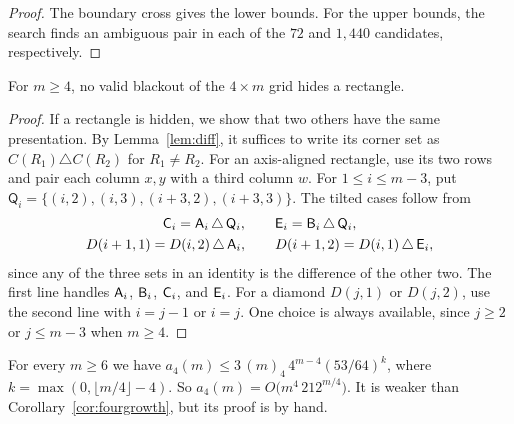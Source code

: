 \begin{proof}
The boundary cross gives the lower bounds. For the upper bounds,
the search finds an ambiguous pair in each of the $72$ and $1{,}440$
candidates, respectively.
\end{proof}

\begin{theorem}\label{thm:hidden}
For $m\ge4$, no valid blackout of the $4\times m$ grid hides a rectangle.
\end{theorem}

\begin{proof}
If a rectangle is hidden, we show that two others have the same presentation.
By Lemma~\ref{lem:diff}, it suffices to write its corner set as
$C(R_1)\triangle C(R_2)$ for $R_1\ne R_2$.
For an axis-aligned rectangle, use its two rows and pair each column
$x,y$ with a third column $w$.
For $1\le i\le m-3$, put
$\mathsf Q_i=\{(i,2),(i,3),(i+3,2),(i+3,3)\}$. The tilted cases follow from
\begin{equation}\label{eq:fourxor}
\begin{gathered}
\mathsf{C}_i=\mathsf{A}_i\,\triangle\,\mathsf Q_i,\qquad \mathsf{E}_i=\mathsf{B}_i\,\triangle\,\mathsf Q_i,\\
D(i+1,1)=D(i,2)\,\triangle\,\mathsf{A}_i,\qquad D(i+1,2)=D(i,1)\,\triangle\,\mathsf{E}_i,
\end{gathered}
\end{equation}
since any of the three sets in an identity is the difference of the
other two. The first line handles $\mathsf{A}_i$, $\mathsf{B}_i$, $\mathsf{C}_i$, and $\mathsf{E}_i$.
For a diamond $D(j,1)$ or $D(j,2)$, use the second line with $i=j-1$
or $i=j$. One choice is always available, since $j\ge2$ or
$j\le m-3$ when $m\ge4$.
\end{proof}

\begin{remark}\label{thm:foursurvival}
For every $m\ge6$ we have $a_4(m)\le3\,(m)_4\,4^{m-4}(53/64)^k$, where
$k=\max(0,\lfloor m/4\rfloor-4)$. So $a_4(m)=O\bigl(m^4\,212^{m/4}\bigr)$.
It is weaker than Corollary~\ref{cor:fourgrowth}, but its proof is by hand.
\end{remark}

